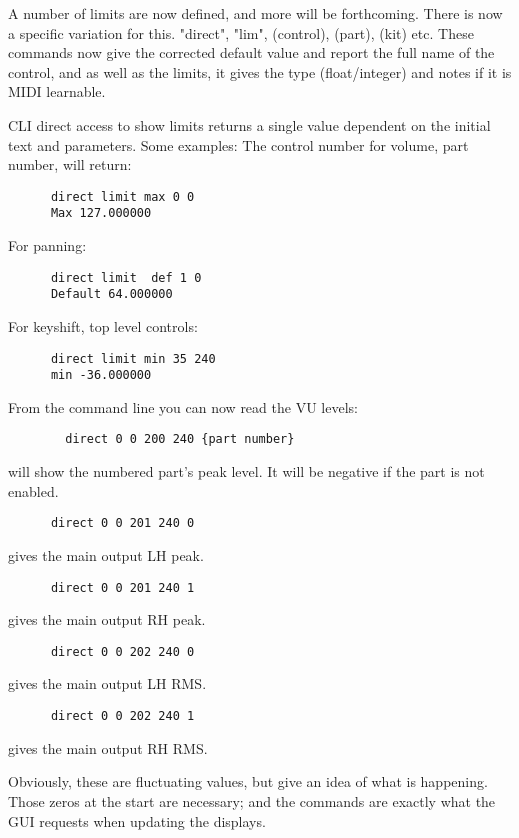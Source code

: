    A number of limits are now defined, and more will be forthcoming. There is
   now a specific variation for this. "direct", "lim", (control), (part), (kit)
   etc.  These commands now give the corrected default value and report the
   full name of the control, and as well as the limits, it gives the type
   (float/integer) and notes if it is MIDI learnable.

   CLI direct access to show limits returns a single value dependent on the
   initial text and parameters.  Some examples:
   The control number for volume, part number, will return:

   \begin{verbatim}
      direct limit max 0 0
      Max 127.000000
   \end{verbatim}

   For panning:

   \begin{verbatim}
      direct limit  def 1 0
      Default 64.000000
   \end{verbatim}

   For keyshift, top level controls:

   \begin{verbatim}
      direct limit min 35 240
      min -36.000000
   \end{verbatim}

	From the command line you can now read the VU levels:

   \begin{verbatim}
		direct 0 0 200 240 {part number}
   \end{verbatim}

	will show the numbered part's peak level.
 	It will be negative if the part is not enabled.

   \begin{verbatim}
      direct 0 0 201 240 0
   \end{verbatim}

gives the main output LH peak.

   \begin{verbatim}
      direct 0 0 201 240 1
   \end{verbatim}

gives the main output RH peak.

   \begin{verbatim}
      direct 0 0 202 240 0
   \end{verbatim}

gives the main output LH RMS.

   \begin{verbatim}
      direct 0 0 202 240 1
   \end{verbatim}

gives the main output RH RMS.

   Obviously, these are fluctuating values, but give an idea of what is
   happening.  Those zeros at the start are necessary; and the commands are
   exactly what the GUI requests when updating the displays.

